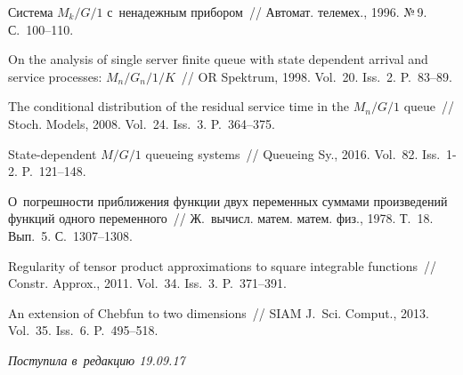 \begin{multicols}{2}
{{\begin{thebibliography}{99}
 Система ${M_k/G/1}$ с~ненадежным прибором~//
Автомат. телемех., 1996. №\,9. С.~100--110.



On the analysis of single server finite queue with state dependent
arrival and service processes: ${M_n/G_n/1/K}$~//
OR Spektrum, 1998. Vol.~20. Iss.~2. P.~83--89.

 The conditional distribution of the residual service time in the ${M_n/G/1}$ 
queue~// Stoch. Models, 2008. Vol.~24. Iss.~3. P.~364--375.

 State-dependent ${M/G/1}$ queueing systems~//
Queueing Sy., 2016. Vol.~82. Iss.~1-2. P.~121--148.

\columnbreak

О~погрешности приближения функции двух переменных суммами
произведений функций одного переменного~//
Ж.~вычисл. матем. матем. физ., 1978. Т.~18. Вып.~5. С.~1307--1308.

\vspace*{7pt}

 Regularity of tensor product approximations to square
integrable functions~// Constr. Approx., 2011. Vol.~34. Iss.~3. P.~371--391.

\vspace*{7pt}

 An extension of Chebfun to two dimensions~// 
SIAM J.~Sci. Comput., 2013. Vol.~35. Iss.~6. P.~495--518.



 \end{thebibliography}

 }
 }

\end{multicols}

\vspace*{-3pt}

\hfill{\small\textit{Поступила в~редакцию 19.09.17}}

\vspace*{8pt}



